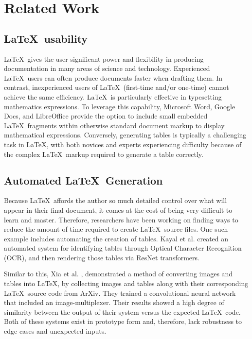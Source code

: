 \section{Related Work}

\subsection{\LaTeX\ usability}

\LaTeX\ gives the user significant power and flexibility in producing documentation in many areas of science and technology. 
Experienced \LaTeX\ users can often produce documents faster when drafting them. 
In contrast, inexperienced users of \LaTeX\ (first-time and/or one-time) cannot achieve the same efficiency. 
\LaTeX\ is particularly effective in typesetting mathematics expressions. 
To leverage this capability, Microsoft Word, Google Docs, and LibreOffice provide the option to include small embedded \LaTeX\ fragments within otherwise standard document markup to display mathematical expressions. 
Conversely, generating tables is typically a challenging task in \LaTeX, with both novices and experts experiencing difficulty because of the complex \LaTeX\ markup required to generate a table correctly.

\subsection{Automated \LaTeX\ Generation}

Because \LaTeX\ affords the author so much detailed control over what will appear in their final document, it comes at the cost of being very difficult to learn and master. 
Therefore, researchers have been working on finding ways to reduce the amount of time required to create \LaTeX\ source files. 
One such example includes automating the creation of tables. 
Kayal et al. \cite{kayal_tables_2023} created an automated system for identifying tables through Optical Character Recognition (OCR), and then rendering those tables via ResNet transformers.

Similar to this, Xia et al. \cite{xia_latexnet_2025}, demonstrated a method of converting images and tables into \LaTeX, by collecting images and tables along with their corresponding \LaTeX\ source code from ArXiv. 
They trained a convolutional neural network that included an image-multiplexer. 
Their results showed a high degree of similarity between the output of their system versus the expected \LaTeX\ code. 
Both of these systems exist in prototype form and, therefore, lack robustness to edge cases and unexpected inputs. 

